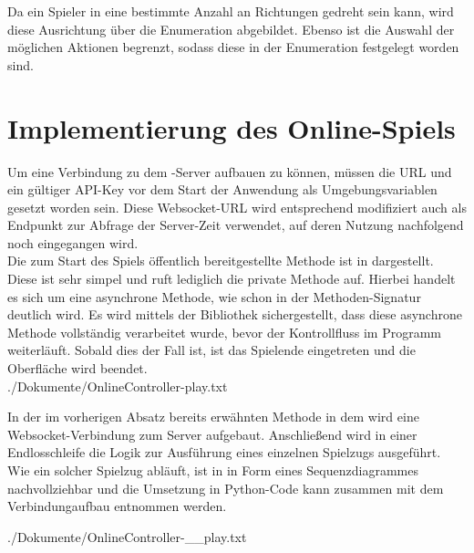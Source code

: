 Da ein Spieler in eine bestimmte Anzahl an Richtungen gedreht sein kann, wird diese Ausrichtung über die Enumeration
 abgebildet.
Ebenso ist die Auswahl der möglichen Aktionen begrenzt, sodass diese in der Enumeration  festgelegt
worden sind.

\section{Implementierung des Online-Spiels}
\label{sec:online-implementierung}

Um eine Verbindung zu dem -Server aufbauen zu können, müssen die URL und ein gültiger API-Key vor dem
Start der Anwendung als Umgebungsvariablen gesetzt worden sein.
Diese Websocket-URL wird entsprechend modifiziert auch als Endpunkt zur Abfrage der Server-Zeit verwendet, auf deren
Nutzung nachfolgend noch eingegangen wird. \\

Die zum Start des Spiels öffentlich bereitgestellte Methode  ist in  dargestellt.
Diese ist sehr simpel und ruft lediglich die private Methode  auf.
Hierbei handelt es sich um eine asynchrone Methode, wie schon in der Methoden-Signatur deutlich wird.
Es wird mittels der Bibliothek  sichergestellt, dass diese asynchrone Methode vollständig verarbeitet
wurde, bevor der Kontrollfluss im Programm weiterläuft.
Sobald dies der Fall ist, ist das Spielende eingetreten und die Oberfläche wird beendet. \\


{./Dokumente/OnlineController-play.txt}

In der im vorherigen Absatz bereits erwähnten Methode  in dem  wird eine
Websocket-Verbindung zum Server aufgebaut.
Anschließend wird in einer Endlosschleife die Logik zur Ausführung eines einzelnen Spielzugs ausgeführt.
Wie ein solcher Spielzug abläuft, ist in  in Form eines Sequenzdiagrammes
nachvollziehbar und die Umsetzung in Python-Code kann zusammen mit dem Verbindungaufbau 
entnommen werden.


{./Dokumente/OnlineController-__play.txt}

